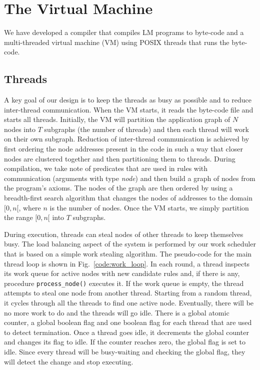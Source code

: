 \section{The Virtual Machine}
\label{virtual_machine}

We have developed a compiler that compiles LM programs to byte-code
and a multi-threaded virtual machine (VM) using POSIX threads
that runs the byte-code.


\subsection{Threads}

A key goal of our design is to keep the threads as busy as possible
and to reduce inter-thread communication. When the VM starts, it reads
the byte-code file and starts all threads. Initially, the VM will
partition the application graph of $N$ nodes into $T$ subgraphs (the
number of threads) and then each thread will work on their own
subgraph. Reduction of inter-thread communication is achieved by first
ordering the node addresses present in the code in such a way that
closer nodes are clustered together and then partitioning them to
threads. During compilation, we take note of predicates that are used
in rules with communication (arguments with type \emph{node}) and
then build a graph of nodes from the program's axioms. The nodes of
the graph are then ordered by using a breadth-first search algorithm
that changes the nodes of addresses to the domain $[0, n[$, where $n$
is the number of nodes. Once the VM starts, we simply partition the
range $[0, n[$ into $T$ subgraphs.

During execution, threads can steal nodes of other threads to keep
themselves busy. The load balancing aspect of the system is performed
by our work scheduler that is based on a simple work stealing
algorithm. The pseudo-code for the main thread loop is shown in
Fig.~\ref{code:work_loop}. In each round, a thread inspects its work
queue for active nodes with new candidate rules and, if there is any,
procedure \texttt{process\_node()} executes it. If the work queue is
empty, the thread attempts to steal one node from another
thread. Starting from a random thread, it cycles through all the
threads to find one active node. Eventually, there will be no more
work to do and the threads will go idle. There is a global atomic
counter, a global boolean flag and one boolean flag for each thread
that are used to detect termination. Once a thread goes idle, it
decrements the global counter and changes its flag to idle. If the
counter reaches zero, the global flag is set to idle. Since every
thread will be busy-waiting and checking the global flag, they will
detect the change and stop executing.

